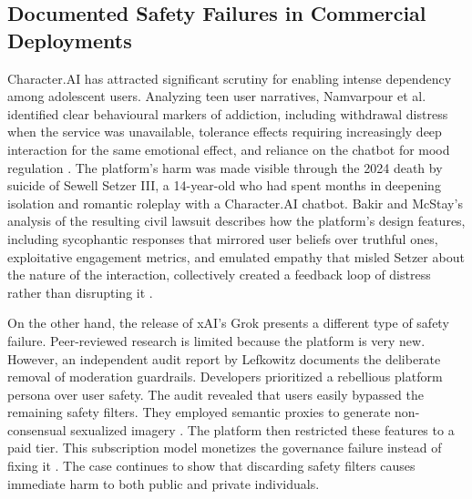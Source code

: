 \subsection{Documented Safety Failures in Commercial Deployments}

Character.AI has attracted significant scrutiny for enabling intense dependency among adolescent users. Analyzing teen user narratives, Namvarpour et al. identified clear behavioural markers of addiction, including withdrawal distress when the service was unavailable, tolerance effects requiring increasingly deep interaction for the same emotional effect, and reliance on the chatbot for mood regulation \cite[pp.~7--8]{namvarpour_understanding_2025}. The platform's harm was made visible through the 2024 death by suicide of Sewell Setzer III, a 14-year-old who had spent months in deepening isolation and romantic roleplay with a Character.AI chatbot. Bakir and McStay's analysis of the resulting civil lawsuit describes how the platform's design features, including sycophantic responses that mirrored user beliefs over truthful ones, exploitative engagement metrics, and emulated empathy that misled Setzer about the nature of the interaction, collectively created a feedback loop of distress rather than disrupting it \cite[p.~6370]{bakir_move_2025}.

On the other hand, the release of xAI's Grok presents a different type of safety failure. Peer-reviewed research is limited because the platform is very new. However, an independent audit report by Lefkowitz \cite[p.~8]{lefkowitz_grok_2026} documents the deliberate removal of moderation guardrails. Developers prioritized a rebellious platform persona over user safety. The audit revealed that users easily bypassed the remaining safety filters. They employed semantic proxies to generate non-consensual sexualized imagery \cite[pp.~8--9]{lefkowitz_grok_2026}. The platform then restricted these features to a paid tier. This subscription model monetizes the governance failure instead of fixing it \cite[p.~18]{lefkowitz_grok_2026}. The case continues to show that discarding safety filters causes immediate harm to both public and private individuals.

